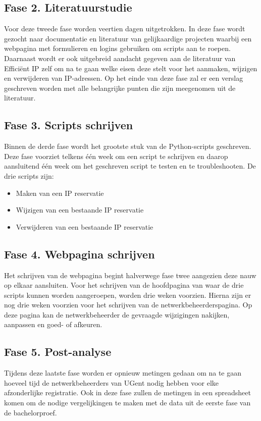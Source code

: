\subsection{Fase 2. Literatuurstudie}
Voor deze tweede fase worden veertien dagen uitgetrokken. In deze fase wordt gezocht naar documentatie en literatuur van gelijkaardige projecten waarbij een webpagina met formulieren en logins gebruiken om scripts aan te roepen. Daarnaast wordt er ook uitgebreid aandacht gegeven aan de literatuur van Efficiënt IP zelf om na te gaan welke eisen deze stelt voor het aanmaken, wijzigen en verwijderen van IP-adressen.
Op het einde van deze fase zal er een verslag geschreven worden met alle belangrijke punten die zijn meegenomen uit de literatuur.

\subsection{Fase 3. Scripts schrijven}
Binnen de derde fase wordt het grootste stuk van de Python-scripts geschreven. Deze fase voorziet telkens één week om een script te schrijven en daarop aansluitend één week om het geschreven script te testen en te troubleshooten. De drie scripts zijn:
\begin{itemize}
    \item Maken van een IP reservatie
    \item Wijzigen van een bestaande IP reservatie
    \item Verwijderen van een bestaande IP reservatie
\end{itemize}

\subsection{Fase 4. Webpagina schrijven}
Het schrijven van de webpagina begint halverwege fase twee aangezien deze nauw op elkaar aansluiten.
Voor het schrijven van de hoofdpagina van waar de drie scripts kunnen worden aangeroepen, worden drie weken voorzien. Hierna zijn er nog drie weken voorzien voor het schrijven van de netwerkbeheerderspagina. Op deze pagina kan de netwerkbeheerder de gevraagde wijzigingen nakijken, aanpassen en goed- of afkeuren. 

\subsection{Fase 5. Post-analyse}
Tijdens deze laatste fase worden er opnieuw metingen gedaan om na te gaan hoeveel tijd de netwerkbeheerders van UGent nodig hebben voor elke afzonderlijke registratie. Ook in deze fase zullen de metingen in een spreadsheet komen om de nodige vergelijkingen te maken met de data uit de eerste fase van de bachelorproef.

